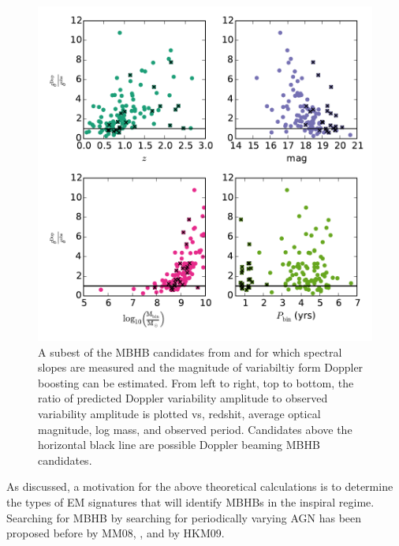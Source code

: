 \begin{figure}
\begin{center}
\includegraphics[scale=0.55]{figures/ch0/PTF_xsiGtr1_vs_z_M_P_alph_I90} 
\end{center}
\caption{A subest of the MBHB candidates from \citep{Graham+2015b} and \citep[][denoted by black x's]{Charisi+2016} for which spectral slopes are measured and the magnitude of variabiltiy form Doppler boosting can be estimated. From left to right, top to bottom, the ratio of predicted Doppler variability amplitude to observed variability amplitude is plotted vs, redshit, average optical magnitude, log mass, and observed period. Candidates above the horizontal black line are possible Doppler beaming MBHB candidates.}
\label{Fig:Contour}
\end{figure}


As discussed, a motivation for the above theoretical calculations is to
determine the types of EM signatures that will identify MBHBs in the inspiral
regime. Searching for MBHB by searching for periodically varying AGN has been
proposed before by MM08, \cite{Haiman+2009}, and by HKM09.
 

